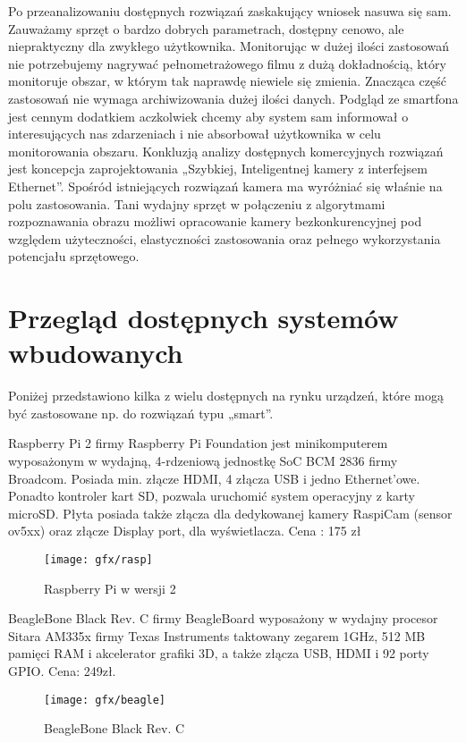 Po przeanalizowaniu dostępnych rozwiązań zaskakujący wniosek nasuwa się sam. Zauważamy sprzęt o bardzo dobrych parametrach, dostępny cenowo, ale niepraktyczny dla zwykłego użytkownika. Monitorując w dużej ilości zastosowań nie potrzebujemy nagrywać pełnometrażowego filmu z dużą dokładnością, który monitoruje obszar, w którym tak naprawdę niewiele się zmienia. Znacząca część zastosowań nie wymaga archiwizowania dużej ilości danych. Podgląd ze smartfona jest cennym dodatkiem aczkolwiek chcemy aby system sam informował o interesujących nas zdarzeniach i nie absorbował użytkownika w celu monitorowania obszaru. Konkluzją analizy dostępnych komercyjnych rozwiązań jest koncepcja zaprojektowania „Szybkiej, Inteligentnej kamery z interfejsem Ethernet”. Spośród istniejących rozwiązań kamera ma wyróżniać się właśnie na polu zastosowania. Tani wydajny sprzęt w połączeniu z algorytmami rozpoznawania obrazu możliwi opracowanie kamery bezkonkurencyjnej pod względem użyteczności, elastyczności zastosowania oraz pełnego wykorzystania potencjału sprzętowego.

\section{Przegląd dostępnych systemów wbudowanych}
Poniżej przedstawiono kilka z wielu dostępnych na rynku urządzeń, które mogą być zastosowane np. do rozwiązań typu „smart”.

Raspberry Pi 2 firmy Raspberry Pi Foundation jest minikomputerem wyposażonym w wydajną, 4-rdzeniową jednostkę SoC BCM 2836 firmy Broadcom. Posiada min.  złącze HDMI, 4 złącza USB i jedno Ethernet’owe. Ponadto kontroler kart SD, pozwala uruchomić system operacyjny z karty microSD. Płyta posiada także złącza dla dedykowanej kamery RaspiCam (sensor ov5xx) oraz złącze Display port, dla wyświetlacza. Cena : 175 zł

\begin{figure}[bth]
\centering
{\texttt{[image: gfx/rasp]}}
\caption[Raspberry Pi w wersji 2]{Raspberry Pi w wersji 2}
\label{fig:Chipscope}
\end{figure}

BeagleBone Black Rev. C firmy BeagleBoard wyposażony w wydajny procesor Sitara AM335x firmy Texas Instruments taktowany zegarem 1GHz, 512 MB pamięci RAM i akcelerator grafiki 3D, a także złącza USB, HDMI i 92 porty GPIO. Cena: 249zł.

\begin{figure}[bth]
\centering
{\texttt{[image: gfx/beagle]}}
\caption[BeagleBone Black Rev. C]{BeagleBone Black Rev. C}
\label{fig:Chipscope}
\end{figure}

